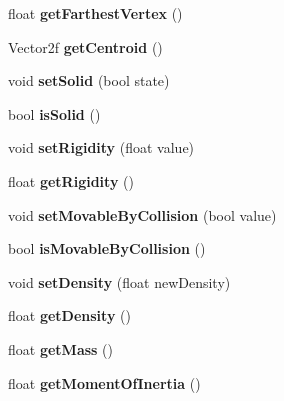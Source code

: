 \begin{DoxyCompactItemize}
\mbox{\label{class_polygon_aa4da77df0658cdcc0797443844c69a3f}} 
float {\bfseries get\+Farthest\+Vertex} ()
\item 
\mbox{\label{class_polygon_a70345633fc22991a66923b2b9db197fc}} 
Vector2f {\bfseries get\+Centroid} ()
\item 
\mbox{\label{class_polygon_a0fc684c823f560d066bc8fdfe10fd8f0}} 
void {\bfseries set\+Solid} (bool state)
\item 
\mbox{\label{class_polygon_a531b42b03e52789c8b9c6869933bf7d3}} 
bool {\bfseries is\+Solid} ()
\item 
\mbox{\label{class_polygon_a5325135466047ff1a8bb215905c54c83}} 
void {\bfseries set\+Rigidity} (float value)
\item 
\mbox{\label{class_polygon_a435f03ba82088fbde142d21950cfa1f3}} 
float {\bfseries get\+Rigidity} ()
\item 
\mbox{\label{class_polygon_ac379bd1b47a91b062cb1489f4be11b2e}} 
void {\bfseries set\+Movable\+By\+Collision} (bool value)
\item 
\mbox{\label{class_polygon_a83af7b70f89b8b27f5dc78f27dcd60d7}} 
bool {\bfseries is\+Movable\+By\+Collision} ()
\item 
\mbox{\label{class_polygon_a21749fb83e0fa8fd98cf646e0e4cbadc}} 
void {\bfseries set\+Density} (float new\+Density)
\item 
\mbox{\label{class_polygon_a93f38d702fe7c95af0ac72910c00908e}} 
float {\bfseries get\+Density} ()
\item 
\mbox{\label{class_polygon_a9c5d5b2df7caf0dc80b00fbcae0a74e2}} 
float {\bfseries get\+Mass} ()
\item 
\mbox{\label{class_polygon_af029d3b7c0e523ab07b376a193b6c7a3}} 
float {\bfseries get\+Moment\+Of\+Inertia} ()
\item 
\mbox{\label{class_polygon_ae404b76af51f552e3bc9dc57ea1d8985}} 

\end{DoxyCompactItemize}
